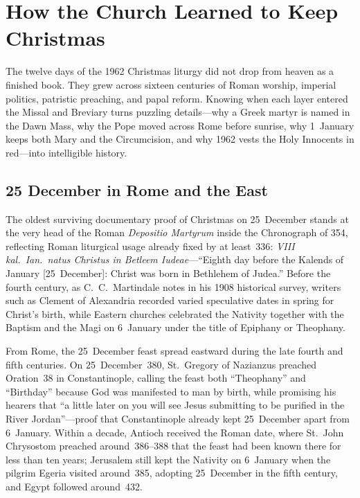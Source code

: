 \section{How the Church Learned to Keep Christmas}\label{sec:history}

The twelve days of the 1962 Christmas liturgy did not drop from heaven as a
finished book. They grew across sixteen centuries of Roman worship, imperial
politics, patristic preaching, and papal reform. Knowing when each layer entered
the Missal and Breviary turns puzzling details---why a Greek martyr is named in
the Dawn Mass, why the Pope moved across Rome before sunrise, why 1~January
keeps both Mary and the Circumcision, and why 1962 vests the Holy Innocents in
red---into intelligible history.

\subsection{25 December in Rome and the East}

The oldest surviving documentary proof of Christmas on 25~December stands at the
very head of the Roman \textit{Depositio Martyrum} inside the Chronograph of
354, reflecting Roman liturgical usage already fixed by at least~336:
\textit{VIII kal.\ Ian.\ natus Christus in Betleem Iudeae}---``Eighth day before
the Kalends of January [25~December]: Christ was born in Bethlehem of Judea.''
Before the fourth century, as C.~C.~Martindale notes in his 1908 historical
survey, writers such as Clement of Alexandria recorded varied speculative dates
in spring for Christ's birth, while Eastern churches celebrated the Nativity
together with the Baptism and the Magi on 6~January under the title of Epiphany
or Theophany.

From Rome, the 25~December feast spread eastward during the late fourth and
fifth centuries. On 25~December~380, St.~Gregory of Nazianzus preached
Oration~38 in Constantinople, calling the feast both ``Theophany'' and
``Birthday'' because God was manifested to man by birth, while promising his
hearers that ``a little later on you will see Jesus submitting to be purified in
the River Jordan''---proof that Constantinople already kept 25~December apart
from 6~January. Within a decade, Antioch received the Roman date, where
St.~John Chrysostom preached around~386--388 that the feast had been known there
for less than ten years; Jerusalem still kept the Nativity on 6~January when the
pilgrim Egeria visited around~385, adopting 25~December in the fifth century,
and Egypt followed around~432.

